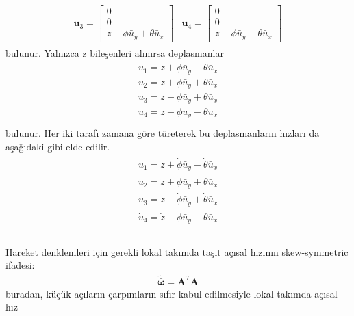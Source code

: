 \documentclass[a4paper]{report}
\begin{document}
\begin{eqnarray*}
\begin{array}{cc}
\mathbf{u}_3=\left[\begin{array}{c} 0\\0\\ z -\phi \bar{u}_{y} + \theta \bar{u}_{x} \end{array} \right]& \mathbf{u}_4=\left[\begin{array}{c} 0\\ 0\\ z -\phi \bar{u}_{y} - \theta \bar{u}_{x} \end{array} \right]
\end{array}
\end{eqnarray*}
bulunur. Yalnızca z bileşenleri alınırsa deplasmanlar
\begin{eqnarray}
\begin{array}{cc}
u_1= z +\phi \bar{u}_{y} - \theta \bar{u}_{x} \\ 
u_2= z +\phi \bar{u}_{y} + \theta \bar{u}_{x} \\
u_3= z -\phi \bar{u}_{y} + \theta \bar{u}_{x} \\
u_4= z -\phi \bar{u}_{y} - \theta \bar{u}_{x} \\
\end{array}
\label{suspensiyon_tasit_uzerindeki_deplasmanlar}
\end{eqnarray}
bulunur. Her iki tarafı zamana göre türeterek bu deplasmanların hızları da aşağıdaki gibi elde edilir.
\begin{eqnarray}
\begin{array}{cc}
\dot{u}_1= \dot{z} +\dot{\phi} \bar{u}_{y} - \dot{\theta} \bar{u}_{x} \\ 
\dot{u}_2= \dot{z} +\dot{\phi} \bar{u}_{y} + \dot{\theta} \bar{u}_{x} \\
\dot{u}_3= \dot{z} -\dot{\phi} \bar{u}_{y} + \dot{\theta} \bar{u}_{x} \\
\dot{u}_4= \dot{z} -\dot{\phi} \bar{u}_{y} - \dot{\theta} \bar{u}_{x} \\
\end{array}
\label{suspensiyon_tasit_uzerindeki_hizlar}
\end{eqnarray}\\
Hareket denklemleri için gerekli lokal takımda taşıt açısal hızının skew-symmetric ifadesi:
\begin{eqnarray*}
\mathbf{\tilde{\bar{{\omega}}}}=\mathbf{A}^T \dot{\mathbf{A}}
\end{eqnarray*}
buradan, küçük açıların çarpımların sıfır kabul edilmesiyle lokal takımda açısal hız
\end{document}
